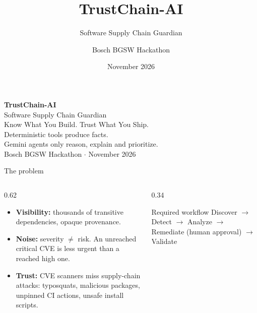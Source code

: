 \documentclass[11pt,aspectratio=169]{beamer}
\title{TrustChain-AI}
\subtitle{Software Supply Chain Guardian}
\author{Bosch BGSW Hackathon}
\date{November 2026}
\begin{document}
{
\begin{frame}[plain]
\vfill
\begin{center}
  {\fontsize{40}{44}\selectfont\bfseries\color{white}Trust\textcolor{guardian}{Chain}-AI}\\[4mm]
  {\Large\color{white}Software Supply Chain Guardian}\\[3mm]
  {\large\color{guardian}Know What You Build. Trust What You Ship.}\\[9mm]
  {\small\color{gray!40}Deterministic tools produce facts.\\
  Gemini agents only reason, explain and prioritize.}\\[9mm]
  {\footnotesize\color{gray!60}Bosch BGSW Hackathon \;$\cdot$\; November 2026}
\end{center}
\vfill
\end{frame}
}

\begin{frame}{The problem}
\begin{columns}[T]
\begin{column}{0.62\textwidth}
\begin{itemize}\setlength\itemsep{3mm}
  \item \textbf{Visibility:} thousands of transitive dependencies, opaque provenance.
  \item \textbf{Noise:} severity $\neq$ risk. An unreached critical CVE is less urgent than a reached high one.
  \item \textbf{Trust:} CVE scanners miss supply-chain attacks: typosquats, malicious packages, unpinned CI actions, unsafe install scripts.
\end{itemize}
\end{column}
\begin{column}{0.34\textwidth}
\begin{block}{Required workflow}
\small Discover $\rightarrow$ Detect $\rightarrow$ Analyze $\rightarrow$ Remediate (human approval) $\rightarrow$ Validate
\end{block}
\end{column}
\end{columns}
\end{frame}
\end{document}
